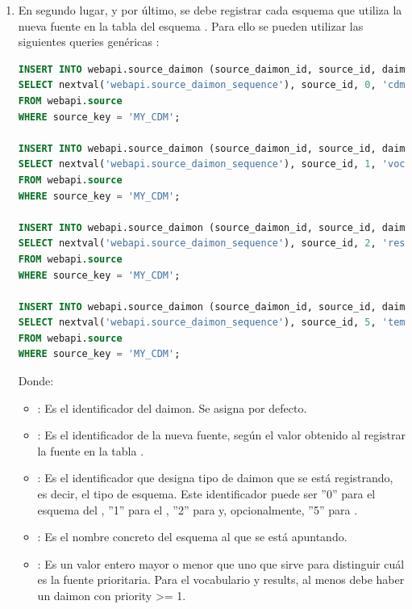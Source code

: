 \begin{enumerate}
    \item En segundo lugar, y por último, se debe registrar cada esquema que utiliza la nueva fuente en la tabla  del esquema . Para ello se pueden utilizar las siguientes queries genéricas \cite{githubCDMConfiguration}:

\begin{lstlisting}[language=sql]
INSERT INTO webapi.source_daimon (source_daimon_id, source_id, daimon_type, table_qualifier, priority) 
SELECT nextval('webapi.source_daimon_sequence'), source_id, 0, 'cdm', 0
FROM webapi.source
WHERE source_key = 'MY_CDM';

INSERT INTO webapi.source_daimon (source_daimon_id, source_id, daimon_type, table_qualifier, priority) 
SELECT nextval('webapi.source_daimon_sequence'), source_id, 1, 'vocab', 1
FROM webapi.source
WHERE source_key = 'MY_CDM';

INSERT INTO webapi.source_daimon (source_daimon_id, source_id, daimon_type, table_qualifier, priority) 
SELECT nextval('webapi.source_daimon_sequence'), source_id, 2, 'results', 1
FROM webapi.source
WHERE source_key = 'MY_CDM';

INSERT INTO webapi.source_daimon (source_daimon_id, source_id, daimon_type, table_qualifier, priority) 
SELECT nextval('webapi.source_daimon_sequence'), source_id, 5, 'temp', 0
FROM webapi.source
WHERE source_key = 'MY_CDM';
\end{lstlisting}

    Donde:
    \begin{itemize}
        \item {}: Es el identificador del daimon. Se asigna por defecto.
        \item {}: Es el identificador de la nueva fuente, según el valor obtenido al registrar la fuente en la tabla .
        \item {}: Es el identificador que designa tipo de daimon que se está registrando, es decir, el tipo de esquema. Este identificador puede ser ''0'' para el esquema del , ''1'' para el , ''2'' para  y, opcionalmente, ''5'' para .
        \item {}: Es el nombre concreto del esquema al que se está apuntando.
        \item {}: Es un valor entero mayor o menor que uno que sirve para distinguir cuál es la fuente prioritaria. Para el vocabulario y results, al menos debe haber un daimon con priority >= 1.  
    \end{itemize}


\end{enumerate}
